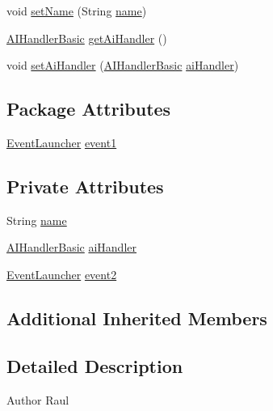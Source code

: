 \begin{DoxyCompactItemize}
\item 
void \mbox{\hyperlink{classentities_1_1_boss_a75f4332245981e1b51ea1b42028561cf}{set\+Name}} (String \mbox{\hyperlink{classentities_1_1_boss_a859a82dc20d22942934fb9f508b87310}{name}})
\item 
\mbox{\hyperlink{classentities_1_1_a_i_handler_basic}{A\+I\+Handler\+Basic}} \mbox{\hyperlink{classentities_1_1_boss_ae66fe60aa4e55353c4c32c945c6453b8}{get\+Ai\+Handler}} ()
\item 
void \mbox{\hyperlink{classentities_1_1_boss_a0c267eb85abdfcf5b1ab6bd3093dc249}{set\+Ai\+Handler}} (\mbox{\hyperlink{classentities_1_1_a_i_handler_basic}{A\+I\+Handler\+Basic}} \mbox{\hyperlink{classentities_1_1_boss_a5b11e193519ab0f145d6c1e672d63714}{ai\+Handler}})
\end{DoxyCompactItemize}
\subsection*{Package Attributes}
\begin{DoxyCompactItemize}
\item 
\mbox{\hyperlink{interfaceentities_1_1_event_launcher}{Event\+Launcher}} \mbox{\hyperlink{classentities_1_1_boss_a83ec98699f7d7252a29bbf6aa70c0201}{event1}}
\end{DoxyCompactItemize}
\subsection*{Private Attributes}
\begin{DoxyCompactItemize}
\item 
String \mbox{\hyperlink{classentities_1_1_boss_a859a82dc20d22942934fb9f508b87310}{name}}
\item 
\mbox{\hyperlink{classentities_1_1_a_i_handler_basic}{A\+I\+Handler\+Basic}} \mbox{\hyperlink{classentities_1_1_boss_a5b11e193519ab0f145d6c1e672d63714}{ai\+Handler}}
\item 
\mbox{\hyperlink{interfaceentities_1_1_event_launcher}{Event\+Launcher}} \mbox{\hyperlink{classentities_1_1_boss_a17e07c1e6ee08f6f8a7250ba25828199}{event2}}
\end{DoxyCompactItemize}
\subsection*{Additional Inherited Members}


\subsection{Detailed Description}
\begin{DoxyAuthor}{Author}
Raul 
\end{DoxyAuthor}


